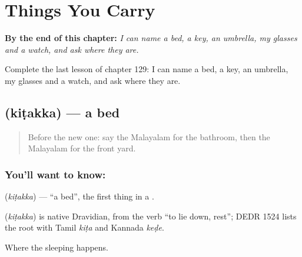 
\chapter{Things You Carry}
\label{ch:ml-things-you-carry}

\begin{chapteropening}
\textbf{By the end of this chapter:} \emph{I can name a bed, a key, an umbrella, my glasses and a watch, and ask where they are.}

Complete the last lesson of chapter 129: I can name a bed, a key, an umbrella, my glasses and a watch, and ask where they are.
\end{chapteropening}

\section[\texorpdfstring{\ml{കിടക്ക} (kiṭakka)}{കിടക്ക (kiṭakka)}]{ (kiṭakka) — a bed}

\label{lesson:ML-C129-bed}



\begin{quote}
Before the new one: say the Malayalam for the bathroom, then the Malayalam for the front yard.
\end{quote}

\subsection*{You'll want to know: }
\textbf{} (\emph{kiṭakka}) — \textquotedblleft{}a bed\textquotedblright{}, the first thing in a \textbf{}.

\begin{cousinweb}
\textbf{} (\emph{kiṭakka}) is native Dravidian, from the verb \textquotedblleft{}to lie down, rest\textquotedblright{}; DEDR 1524 lists the root with Tamil \emph{kiṭa} and Kannada \emph{keḍe}.
\end{cousinweb}

\begin{grammarlens}[title={What you've built}]
Where the sleeping happens.
\end{grammarlens}

